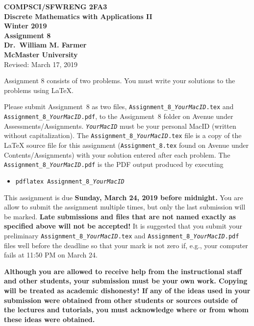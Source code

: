 \documentclass[11pt,fleqn]{article}
\begin{document}
\begin{center}

  {\large \textbf{COMPSCI/SFWRENG 2FA3}}\\[2mm]
  {\large \textbf{Discrete Mathematics with Applications II}}\\[2mm]
  {\large \textbf{Winter 2019}}\\[8mm]
  {\huge \textbf{Assignment 8}}\\[6mm]
  {\large \textbf{Dr.~William M. Farmer}}\\[2mm]
  {\large \textbf{McMaster University}}\\[6mm]
  {\large Revised: March 17, 2019}

\end{center}

\medskip

Assignment 8 consists of two problems.  You must write your solutions
to the problems using LaTeX.

Please submit Assignment~8 as two files,
\texttt{Assignment\_8\_\emph{YourMacID}.tex} and
\texttt{Assignment\_8\_\emph{YourMacID}.pdf}, to the Assignment~8
folder on Avenue under Assessments/Assignments.
\texttt{\emph{YourMacID}} must be your personal MacID (written without
capitalization).  The \texttt{Assignment\_8\_\emph{YourMacID}.tex}
file is a copy of the LaTeX source file for this assignment
(\texttt{Assignment\_8.tex} found on Avenue under
Contents/Assignments) with your solution entered after each problem.
The \texttt{Assignment\_8\_\emph{YourMacID}.pdf} is the PDF output
produced by executing

\begin{itemize}

  \item[] \texttt{pdflatex Assignment\_8\_\emph{YourMacID}}

\end{itemize}

This assignment is due \textbf{Sunday, March 24, 2019 before
  midnight.}  You are allow to submit the assignment multiple times,
but only the last submission will be marked.  \textbf{Late submissions
  and files that are not named exactly as specified above will not be
  accepted!}  It is suggested that you submit your preliminary
\texttt{Assignment\_8\_\emph{YourMacID}.tex} and
\texttt{Assignment\_8\_\emph{YourMacID}.pdf} files well before the
deadline so that your mark is not zero if, e.g., your computer fails
at 11:50 PM on March 24.

\textbf{Although you are allowed to receive help from the
  instructional staff and other students, your submission must be your
  own work.  Copying will be treated as academic dishonesty! If any of
  the ideas used in your submission were obtained from other students
  or sources outside of the lectures and tutorials, you must
  acknowledge where or from whom these ideas were obtained.}
\end{document}
